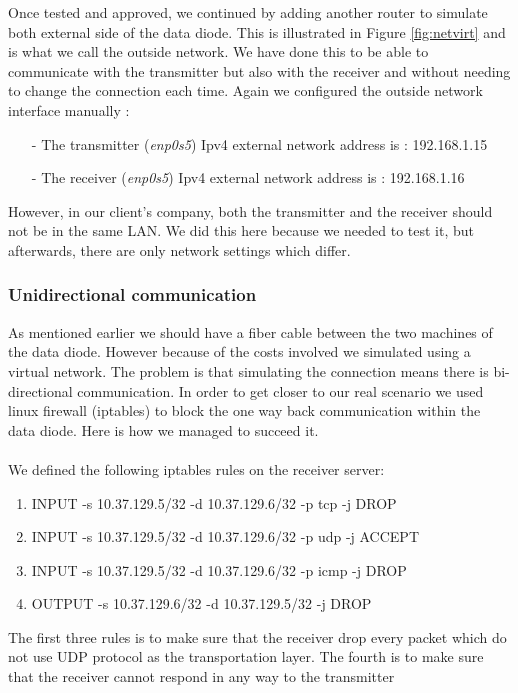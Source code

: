 \documentclass[a4paper,10pt]{article}
\begin{document}
Once tested and approved, we continued by adding another router to simulate both external side of the data diode. This is illustrated in Figure \ref{fig:netvirt} and is what we call the outside network. We have done this to be able to communicate with the transmitter but also with the receiver and without needing to change the connection each time. Again we configured the outside network interface manually :
\begin{enumerate}
\item[-] The transmitter (\emph{enp0s5}) Ipv4 external network address is : 192.168.1.15
\item[-] The receiver (\emph{enp0s5}) Ipv4 external network address is : 192.168.1.16
\end{enumerate}

However, in our client's company, both the transmitter and the receiver should not be in the same LAN. We did this here because we needed to test it, but afterwards, there are only network settings which differ.\subsubsection{Unidirectional communication}
As mentioned earlier we should have a fiber cable between the two machines of the data diode. However because of the costs involved we simulated using a virtual network. The problem is that simulating the connection means there is bi-directional communication. In order to get closer to our real scenario we used linux firewall (iptables) to block the one way back communication within the data diode. Here is how we managed to succeed it.

\paragraph{}We defined the following iptables rules on the receiver server:
\begin{enumerate}
\item INPUT -s 10.37.129.5/32 -d 10.37.129.6/32 -p tcp -j DROP
\item INPUT -s 10.37.129.5/32 -d 10.37.129.6/32 -p udp -j ACCEPT
\item INPUT -s 10.37.129.5/32 -d 10.37.129.6/32 -p icmp -j DROP
\item OUTPUT -s 10.37.129.6/32 -d 10.37.129.5/32 -j DROP
\end{enumerate}

The first three rules is to make sure that the receiver drop every packet which do not use UDP protocol as the transportation layer. The fourth is to make sure that the receiver cannot respond in any way to the transmitter
\end{document}
